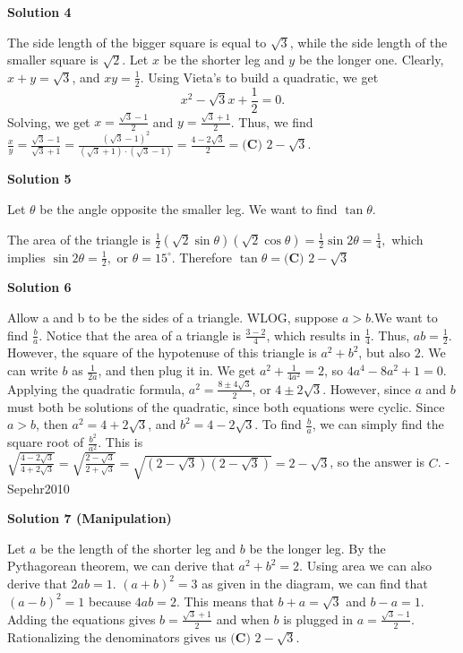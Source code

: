 \begin{enumerate}
 



\textbf{Solution 4}

The side length of the bigger square is equal to $\sqrt{3}$, while the side length of the smaller square is $\sqrt{2}$. Let $x$ be the shorter leg and $y$ be the longer one. Clearly, $x+y=\sqrt{3}$, and $xy=\frac{1}{2}$. Using Vieta's to build a quadratic, we get 
 \[x^2-\sqrt{3}x+\frac{1}{2}=0.\] Solving, we get $x=\frac{\sqrt{3}-1}{2}$ and $y=\frac{\sqrt{3}+1}{2}$. Thus,  we find $\frac{x}{y}=\frac{\sqrt{3}-1}{\sqrt{3}+1}=\frac{(\sqrt{3}-1)^2}{(\sqrt{3}+1)\cdot(\sqrt{3}-1)}=\frac{4-2\sqrt{3}}{2}=\boxed{\textbf{(C) }2-\sqrt3}$.

 


 



\textbf{Solution 5}

Let $\theta$ be the angle opposite the smaller leg. We want to find $\tan\theta$.

 The area of the triangle is $\frac{1}{2}\left(\sqrt{2}\sin\theta\right)\left(\sqrt{2}\cos\theta\right)=\frac{1}{2}\sin 2\theta=\frac{1}{4},$ which implies $\sin 2\theta = \frac{1}{2},$ or $\theta=15^\circ$. Therefore $\tan \theta = \boxed{\textbf{(C) }2-\sqrt3}$




\textbf{Solution 6}

Allow a and b to be the sides of a triangle. WLOG, suppose $a > b.$We want to find $\frac{b}{a}$. Notice that the area of a triangle is $\frac{3-2}{4}$, which results in $\frac{1}{4}$. Thus, $ab = \frac{1}{2}$. However, the square of the hypotenuse of this triangle is $a^2+b^2$, but also $2$. We can write $b$ as $\frac{1}{2a}$, and then plug it in. We get $a^2+\frac{1}{4a^2} = 2$, so $4a^4-8a^2+1 = 0$. Applying the quadratic formula, $a^2 = \frac{8 \pm 4\sqrt{3}}{2}$, or $4 \pm 2\sqrt3$. However, since $a$ and $b$ must both be solutions of the quadratic, since both equations were cyclic. Since $a>b$, then $a^2 = 4+2\sqrt3$, and $b^2 = 4-2\sqrt3$. To find $\frac{b}{a}$, we can simply find the square root of $\frac{b^2}{a^2}$. This is $\sqrt{\frac{4-2\sqrt3}{4+2\sqrt3}} = \sqrt{\frac{2-\sqrt3}{2+\sqrt3}} = \sqrt{(2-\sqrt3)(2-\sqrt3)} = \boxed {2-\sqrt3}$, so the answer is $\boxed {C}$. - Sepehr2010

 



\textbf{Solution 7 (Manipulation)}

Let $a$ be the length of the shorter leg and $b$ be the longer leg. By the Pythagorean theorem, we can derive that $a^2+b^2=2$. Using area we can also derive that $2ab=1$. $(a+b)^2=3$ as given in the diagram, we can find that $(a-b)^2=1$ because $4ab=2$. This means that $b+a=\sqrt{3}$ and $b-a=1$. Adding the equations gives $b=\frac{\sqrt{3}+1}{2}$ and when $b$ is plugged in $a = \frac{\sqrt{3}-1}{2}$. Rationalizing the denominators gives us $\boxed{\textbf{(C) } 2-\sqrt{3}}$.


\end{enumerate}
